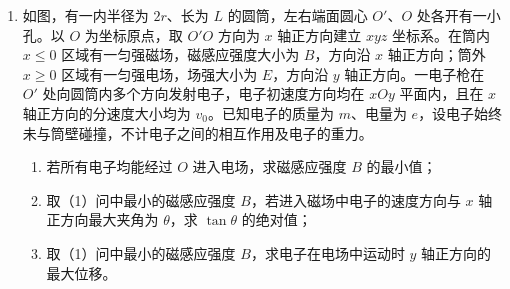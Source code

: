 \documentclass[\gkver]{gaokaozhenti}
\begin{document}
\begin{enumerate}
{\begin{enumerate}
	\item
	$5\times10^{-3} \Umq$

\end{enumerate}
}

\item
如图，有一内半径为 $2r$、长为 $L$ 的圆筒，左右端面圆心 $O'$、$O$ 处各开有一小孔。以 $O$ 为坐标原点，取 $O'O$ 方向为 $x$ 轴正方向建立 $xyz$ 坐标系。在筒内 $x \leq 0$ 区域有一匀强磁场，磁感应强度大小为 $B$，方向沿 $x$ 轴正方向；筒外 $x \geq 0$ 区域有一匀强电场，场强大小为 $E$，方向沿 $y$ 轴正方向。一电子枪在 $O'$ 处向圆筒内多个方向发射电子，电子初速度方向均在 $xOy$ 平面内，且在 $x$ 轴正方向的分速度大小均为 $v_{0}$。已知电子的质量为 $m$、电量为 $e$，设电子始终未与筒壁碰撞，不计电子之间的相互作用及电子的重力。
\begin{enumerate}
	\item
	若所有电子均能经过 $O$ 进入电场，求磁感应强度 $B$ 的最小值；
	\item
	取（1）问中最小的磁感应强度 $B$，若进入磁场中电子的速度方向与 $x$ 轴正方向最大夹角为 $\theta$，求 $\tan\theta$ 的绝对值；
	\item
	取（1）问中最小的磁感应强度 $B$，求电子在电场中运动时 $y$ 轴正方向的最大位移。
\end{enumerate}

\end{enumerate}
\end{document}
